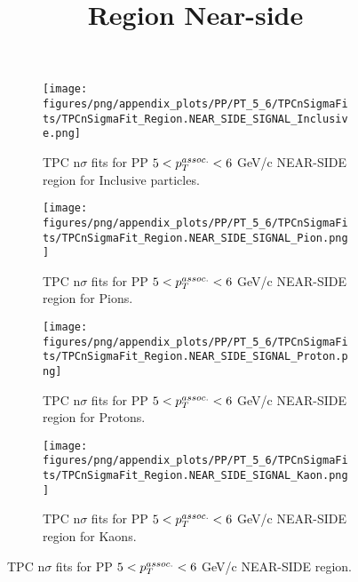             \begin{figure}[H]
                \title{Region Near-side}
                \begin{subfigure}[b]{0.5\textwidth}
                    \centering
                    \texttt{[image: figures/png/appendix\_plots/PP/PT\_5\_6/TPCnSigmaFits/TPCnSigmaFit\_Region.NEAR\_SIDE\_SIGNAL\_Inclusive.png]}
                    \caption{TPC n$\sigma$ fits for PP $5 < \pTassoc < 6$ GeV/c NEAR-SIDE region for Inclusive particles.}
                    \label{fig:appendix_PP_$5 < \pTassoc < 6$ GeV/c_NEAR_SIDE_SIGNAL_Inclusive}
                \end{subfigure}
                \begin{subfigure}[b]{0.5\textwidth}
                    \centering
                    \texttt{[image: figures/png/appendix\_plots/PP/PT\_5\_6/TPCnSigmaFits/TPCnSigmaFit\_Region.NEAR\_SIDE\_SIGNAL\_Pion.png]}
                    \caption{TPC n$\sigma$ fits for PP $5 < \pTassoc < 6$ GeV/c NEAR-SIDE region for Pions.}
                    \label{fig:appendix_PP_$5 < \pTassoc < 6$ GeV/c_NEAR_SIDE_SIGNAL_Pion}
                \end{subfigure}
                \begin{subfigure}[b]{0.5\textwidth}
                    \centering
                    \texttt{[image: figures/png/appendix\_plots/PP/PT\_5\_6/TPCnSigmaFits/TPCnSigmaFit\_Region.NEAR\_SIDE\_SIGNAL\_Proton.png]}
                    \caption{TPC n$\sigma$ fits for PP $5 < \pTassoc < 6$ GeV/c NEAR-SIDE region for Protons.}
                    \label{fig:appendix_PP_$5 < \pTassoc < 6$ GeV/c_NEAR_SIDE_SIGNAL_Proton}
                \end{subfigure}
                \begin{subfigure}[b]{0.5\textwidth}
                    \centering
                    \texttt{[image: figures/png/appendix\_plots/PP/PT\_5\_6/TPCnSigmaFits/TPCnSigmaFit\_Region.NEAR\_SIDE\_SIGNAL\_Kaon.png]}
                    \caption{TPC n$\sigma$ fits for PP $5 < \pTassoc < 6$ GeV/c NEAR-SIDE region for Kaons.}
                    \label{fig:appendix_PP_$5 < \pTassoc < 6$ GeV/c_NEAR_SIDE_SIGNAL_Kaon}
                \end{subfigure}
                \caption{TPC n$\sigma$ fits for PP $5 < \pTassoc < 6$ GeV/c NEAR-SIDE region.}
                \label{fig:appendix_PP_$5 < \pTassoc < 6$ GeV/c_NEAR_SIDE_SIGNAL}
            \end{figure}
